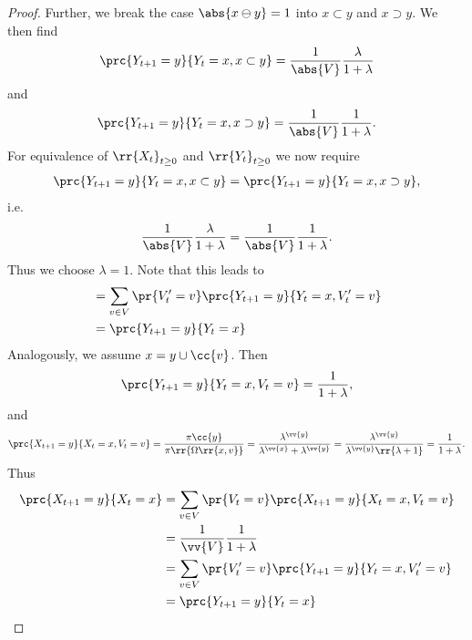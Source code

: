 \documentclass{article}
\begin{document}
\begin{claim*}[1]
\begin{proof}
    Further, we break the case $\abs{x\ominus y}=1$
    into $x\subset y$ and $x\supset y$. We then find
    \begin{align*}
      \prc{Y_{t+1}=y}{Y_t=x, x\subset y} = \frac{1}{\abs{V}} \frac{\lambda}{1+\lambda}
    \end{align*}
    and
    \begin{align*}
      \prc{Y_{t+1}=y}{Y_t=x, x\supset y} = \frac{1}{\abs{V}} \frac{1}{1+\lambda}.
    \end{align*}
    For equivalence of $\rr{X_t}_{t\geq 0}$ and $\rr{Y_t}_{t\geq 0}$ we now require
    \begin{align*}
      \prc{Y_{t+1}=y}{Y_t=x, x\subset y} = \prc{Y_{t+1}=y}{Y_t=x, x\supset y},
    \end{align*}
    i.e.
    \begin{align*}
      \frac{1}{\abs{V}} \frac{\lambda}{1+\lambda} = \frac{1}{\abs{V}} \frac{1}{1+\lambda}.
    \end{align*}
    Thus we choose $\lambda = 1$. Note that this leads to
    \begin{align*}
                             &= \sum_{v\in V} \pr{V'_t=v}\prc{Y_{t+1}=y}{Y_t=x, V'_t= v} \\
                             &=\prc{Y_{t+1}=y}{Y_t=x}
    \end{align*}
    Analogously, we assume $x=y\cup\cc{v}$. Then
    \begin{align*}
      \prc{Y_{t+1}=y}{Y_t=x, V_t=v} = \frac{1}{1+\lambda},
    \end{align*}
    and
    \begin{align*}
      \prc{X_{t+1}=y}{X_t=x, V_t=v}
      = \frac{\pi\cc{y}}{\pi\rr{\Omega\rr{x,v}}}
      = \frac{\lambda^{\vv{y}}}{\lambda^{\vv{x}}+\lambda^{\vv{y}}}
      = \frac{\lambda^{\vv{y}}}{\lambda^{\vv{y}}\rr{\lambda+1}}
      = \frac{1}{1+\lambda}.
    \end{align*}
    Thus
    \begin{align*}
      \prc{X_{t+1}=y}{X_t=x} &= \sum_{v\in V} \pr{V_t=v}\prc{X_{t+1}=y}{X_t=x, V_t= v} \\
                             &= \frac{1}{\vv{V}} \frac{1}{1+\lambda} \\
                             &= \sum_{v\in V} \pr{V'_t=v}\prc{Y_{t+1}=y}{Y_t=x, V'_t= v} \\
                             &=\prc{Y_{t+1}=y}{Y_t=x}
    \end{align*}


\end{proof}
\end{claim*}
\end{document}
